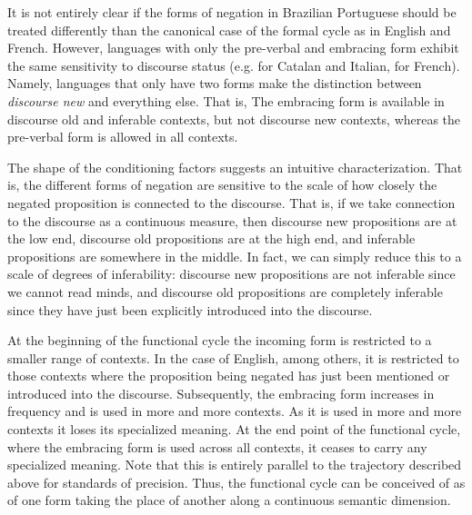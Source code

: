 \documentclass[12pt]{upenndiss}
\theoremstyle{definition} \newtheorem{definition}{Definition}
\begin{document}
It is not entirely clear if the forms of negation in Brazilian Portuguese should be treated differently than the canonical case of the formal cycle as in English and French. However, languages with only the pre-verbal and embracing form exhibit the same sensitivity to discourse status (e.g. \cite{schwenter2006} for Catalan and Italian, \cite{hansen2009} for French). Namely, languages that only have two forms make the distinction between \emph{discourse new} and everything else. That is, The embracing form is available in discourse old and inferable contexts, but not discourse new contexts, whereas the pre-verbal form is allowed in all contexts.  


The shape of the conditioning factors suggests an intuitive characterization. That is, the different forms of negation are sensitive to the scale of how closely the negated proposition is connected to the discourse. That is, if we take connection to the discourse as a continuous measure, then discourse new propositions are at the low end, discourse old propositions are at the high end, and inferable propositions are somewhere in the middle. In fact, we can simply reduce this to a scale of degrees of inferability: discourse new propositions are not inferable since we cannot read minds, and discourse old propositions are completely inferable since they have just been explicitly introduced into the discourse. 

At the beginning of the functional cycle the incoming form is restricted to a smaller range of contexts. In the case of English, among others, it is restricted to those contexts where the proposition being negated has just been mentioned or introduced into the discourse. Subsequently, the embracing form increases in frequency and is used in more and  more contexts. As it is used in more and more contexts it loses its specialized meaning. At the end point of the functional cycle, where the embracing form is used across all contexts, it ceases to carry any specialized meaning. Note that this is entirely parallel to the trajectory described above for standards of precision. Thus, the functional cycle can be conceived of as of one form taking the place of another along a continuous semantic dimension.
\end{document}
